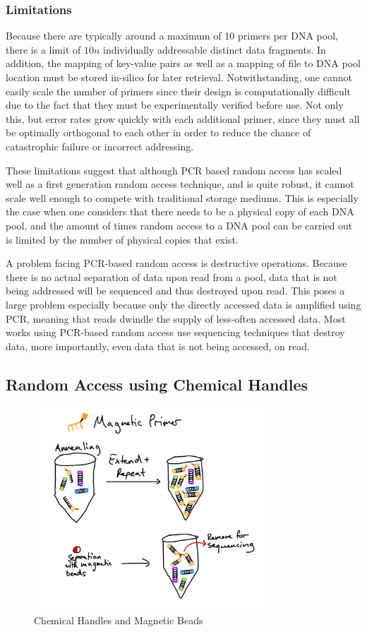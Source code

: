 \documentclass[a4paper,conference]{IEEEtran}
\begin{document}
\subsubsection{Limitations}
Because there are typically around a maximum of 10 primers per DNA pool, there is a limit of $10n$ individually addressable distinct data fragments. In addition, the mapping of key-value pairs as well as a mapping of file to DNA pool location must be stored in-silico for later retrieval. Notwithstanding, one cannot easily scale the number of primers since their design is computationally difficult due to the fact that they must be experimentally verified before use. Not only this, but error rates grow quickly with each additional primer, since they must all be optimally orthogonal to each other in order to reduce the chance of catastrophic failure or incorrect addressing.

These limitations suggest that although PCR based random access has scaled well as a first generation random access technique, and is quite robust, it cannot scale well enough to compete with traditional storage mediums. This is especially the case when one considers that there needs to be a physical copy of each DNA pool, and the amount of times random access to a DNA pool can be carried out is limited by the number of physical copies that exist.

A problem facing PCR-based random access is destructive operations. Because there is no actual separation of data upon read from a pool, data that is not being addressed will be sequenced and thus destroyed upon read. This poses a large problem especially because only the directly accessed data is amplified using PCR, meaning that reads dwindle the supply of less-often accessed data. Most works using PCR-based random access use sequencing techniques that destroy data, more importantly, even data that is not being accessed, on read.

\subsection{Random Access using Chemical Handles}

\begin{figure}[!t]
\centering
\includegraphics[width=3.5in]{chemicalhandlesRA}
\caption{Chemical Handles and Magnetic Beads}
\label{pcr_challenges}
\end{figure}
\end{document}

